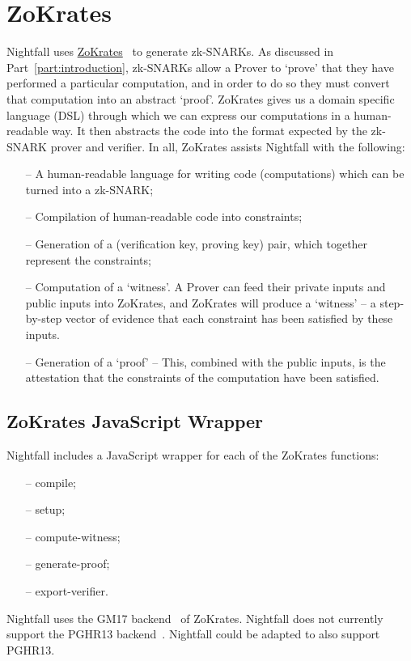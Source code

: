 \section{ZoKrates}
\label{sec:zokrates}
Nightfall uses \href{https://github.com/Zokrates/ZoKrates}{ZoKrates}~\cite{zokrates} to generate zk-SNARKs.
As discussed in Part~\ref{part:introduction},
zk-SNARKs allow a Prover to `prove' that they have performed a particular computation, 
and in order to do so they must convert that computation into an abstract `proof'. 
ZoKrates gives us a domain specific language (DSL) through which we can express our computations in a human-readable way.
It then abstracts the code into the format expected by the zk-SNARK prover and verifier.
In all, ZoKrates assists Nightfall with the following:
\begin{itemize} \itemsep-0.5em
  \item[--] A human-readable language for writing code (computations) which can be turned into a zk-SNARK;
  \item[--] Compilation of human-readable code into constraints;
  \item[--] Generation of a (verification key, proving key) pair, which together represent the constraints;
  \item[--] Computation of a `witness'. A Prover can feed their private inputs and public inputs into ZoKrates, and ZoKrates will produce a `witness' -- a step-by-step vector of evidence that each constraint has been satisfied by these inputs.
  \item[--] Generation of a `proof' -- This, combined with the public inputs, is the attestation that the constraints of the computation have been satisfied.
\end{itemize}

\subsection{ZoKrates JavaScript Wrapper}
\label{sec:zokratesJavascriptWrapper}

Nightfall includes a JavaScript wrapper for each of the ZoKrates functions:
\begin{itemize} \itemsep-0.5em
  \item[--] compile;
  \item[--] setup;
  \item[--] compute-witness;
  \item[--] generate-proof;
  \item[--] export-verifier.
\end{itemize}
Nightfall uses the GM17 backend~\cite{DBLP:conf/crypto/GrothM17} of ZoKrates. Nightfall does not currently support the PGHR13 backend~\cite{DBLP:journals/cacm/ParnoHG016}.
Nightfall could be adapted to also support PGHR13.

